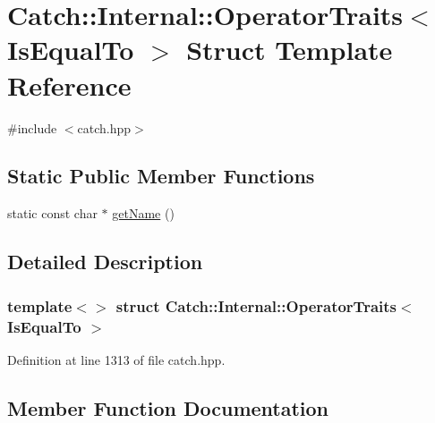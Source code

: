 \hypertarget{struct_catch_1_1_internal_1_1_operator_traits_3_01_is_equal_to_01_4}{}\section{Catch\+:\+:Internal\+:\+:Operator\+Traits$<$ Is\+Equal\+To $>$ Struct Template Reference}
\label{struct_catch_1_1_internal_1_1_operator_traits_3_01_is_equal_to_01_4}


{\ttfamily \#include $<$catch.\+hpp$>$}

\subsection*{Static Public Member Functions}
\begin{DoxyCompactItemize}
\item 
static const char $\ast$ \hyperlink{struct_catch_1_1_internal_1_1_operator_traits_3_01_is_equal_to_01_4_addf03ac66f0ed83abcc037a7a327d4f1}{get\+Name} ()
\end{DoxyCompactItemize}


\subsection{Detailed Description}
\subsubsection*{template$<$$>$\newline
struct Catch\+::\+Internal\+::\+Operator\+Traits$<$ Is\+Equal\+To $>$}



Definition at line 1313 of file catch.\+hpp.



\subsection{Member Function Documentation}
\hypertarget{struct_catch_1_1_internal_1_1_operator_traits_3_01_is_equal_to_01_4_addf03ac66f0ed83abcc037a7a327d4f1}{}\label{struct_catch_1_1_internal_1_1_operator_traits_3_01_is_equal_to_01_4_addf03ac66f0ed83abcc037a7a327d4f1} 
